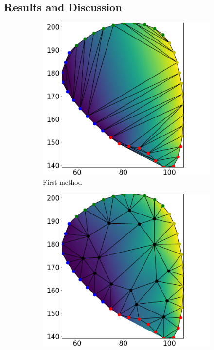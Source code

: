 \subsection{Results and Discussion}

\begin{figure}%
  \centering%
  \begin{subfigure}[t]{0.31\textwidth}%
    \centering%
    \includegraphics[width=\textwidth]{images/fiber_creation/u_0.png}%
    \caption{First method}%
    \label{fig:triu_0}%
  \end{subfigure}
  \quad
  \begin{subfigure}[t]{0.31\textwidth}%
    \centering%
    \includegraphics[width=\textwidth]{images/fiber_creation/u_1.png}%

\end{subfigure}
\end{figure}
